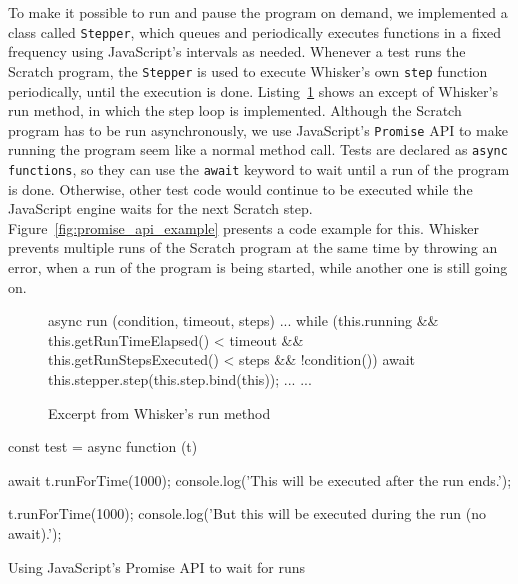 To make it possible to run and pause the program on demand, we implemented a class called \texttt{Stepper},
which queues and periodically executes functions in a fixed frequency using JavaScript's intervals as needed.
Whenever a test runs the Scratch program,
the \texttt{Stepper} is used to execute Whisker's own \texttt{step} function periodically,
until the execution is done.
Listing~\ref{fig:run_method_excerpt} shows an except of Whisker's run method,
in which the step loop is implemented.
Although the Scratch program has to be run asynchronously, we use JavaScript's \texttt{Promise} API to make running the program seem like a normal method call.
Tests are declared as \texttt{async functions}, so they can use the \texttt{await} keyword to wait until a run of the program is done.
Otherwise, other test code would continue to be executed while the JavaScript engine waits for the next Scratch step.
Figure~\ref{fig:promise_api_example} presents a code example for this.
Whisker prevents multiple runs of the Scratch program at the same time by throwing an error,
when a run of the program is being started, while another one is still going on.
\parspace

\begin{figure}[htpb]
    \centering

    \begin{minipage}{.9\textwidth}
        \begin{javascriptcode}
            async run (condition, timeout, steps) {
                ...
                while (this.running &&
                       this.getRunTimeElapsed() < timeout &&
                       this.getRunStepsExecuted() < steps &&
                       !condition()) {
                    await this.stepper.step(this.step.bind(this));
                    ...
                }
                ...
            }
        \end{javascriptcode}
    \end{minipage}

    \caption{Excerpt from Whisker's run method}
    \label{fig:run_method_excerpt}
\end{figure}

\begin{listing}[htpb]
    \centering

    \begin{minipage}{.9\textwidth}
        \begin{javascriptcode}
            const test = async function (t) {
                await t.runForTime(1000);
                console.log('This will be executed after the run ends.');

                t.runForTime(1000);
                console.log('But this will be executed during the run (no await).');
            }
        \end{javascriptcode}
    \end{minipage}

    \caption{Using JavaScript's Promise API to wait for runs}
    \label{fig:promise_api_example}
\end{listing}

